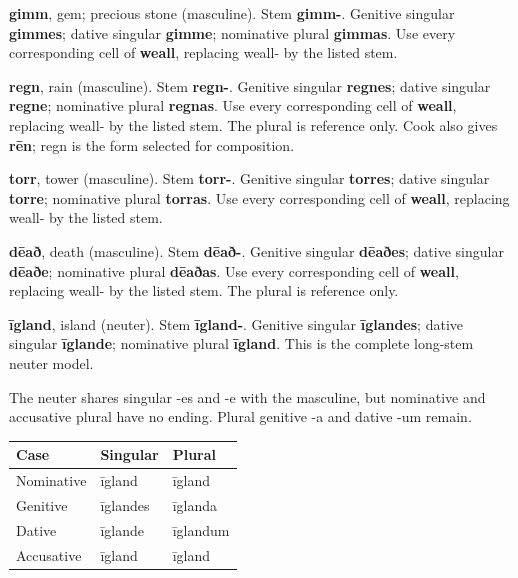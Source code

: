 \textbf{gimm}, gem; precious stone (masculine). Stem \textbf{gimm-}. Genitive singular \textbf{gimmes}; dative singular \textbf{gimme}; nominative plural \textbf{gimmas}. Use every corresponding cell of \textbf{weall}, replacing weall- by the listed stem.

\textbf{regn}, rain (masculine). Stem \textbf{regn-}. Genitive singular \textbf{regnes}; dative singular \textbf{regne}; nominative plural \textbf{regnas}. Use every corresponding cell of \textbf{weall}, replacing weall- by the listed stem. The plural is reference only. Cook also gives \textbf{rēn}; regn is the form selected for composition.

\textbf{torr}, tower (masculine). Stem \textbf{torr-}. Genitive singular \textbf{torres}; dative singular \textbf{torre}; nominative plural \textbf{torras}. Use every corresponding cell of \textbf{weall}, replacing weall- by the listed stem.

\textbf{dēað}, death (masculine). Stem \textbf{dēað-}. Genitive singular \textbf{dēaðes}; dative singular \textbf{dēaðe}; nominative plural \textbf{dēaðas}. Use every corresponding cell of \textbf{weall}, replacing weall- by the listed stem. The plural is reference only.

\textbf{īgland}, island (neuter). Stem \textbf{īgland-}. Genitive singular \textbf{īglandes}; dative singular \textbf{īglande}; nominative plural \textbf{īgland}. This is the complete long-stem neuter model.

The neuter shares singular -es and -e with the masculine, but nominative and accusative plural have no ending. Plural genitive -a and dative -um remain.

\par\begingroup
\fontsize{10.5}{13.2}\selectfont
\setlength{\LTleft}{0pt}\setlength{\LTright}{\fill}
\noindent
\begin{tabular}{@{}>{\raggedright\arraybackslash}p{39.46mm}>{\raggedright\arraybackslash}p{39.46mm}>{\raggedright\arraybackslash}p{39.46mm}@{}}
\toprule
\textbf{Case} & \textbf{Singular} & \textbf{Plural} \\
\midrule
Nominative & īgland & īgland \\
Genitive & īglandes & īglanda \\
Dative & īglande & īglandum \\
Accusative & īgland & īgland \\
\bottomrule
\end{tabular}
\par\endgroup

